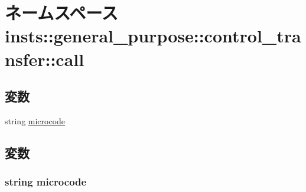 \hypertarget{namespaceinsts_1_1general__purpose_1_1control__transfer_1_1call}{
\section{ネームスペース insts::general\_\-purpose::control\_\-transfer::call}
\label{namespaceinsts_1_1general__purpose_1_1control__transfer_1_1call}
}
\subsection*{変数}
\begin{DoxyCompactItemize}
\item 
string \hyperlink{namespaceinsts_1_1general__purpose_1_1control__transfer_1_1call_a770f11a173e99389a8802f0107ed8f52}{microcode}
\end{DoxyCompactItemize}


\subsection{変数}
\hypertarget{namespaceinsts_1_1general__purpose_1_1control__transfer_1_1call_a770f11a173e99389a8802f0107ed8f52}{
\subsubsection[{microcode}]{\setlength{\rightskip}{0pt plus 5cm}string {\bf microcode}}}
\label{namespaceinsts_1_1general__purpose_1_1control__transfer_1_1call_a770f11a173e99389a8802f0107ed8f52}
